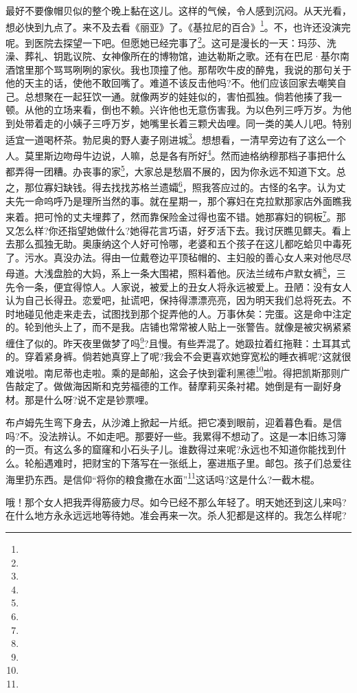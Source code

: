 \par 最好不要像帽贝似的整个晚上黏在这儿。这样的气候，令人感到沉闷。从天光看，想必快到九点了。来不及去看《丽亚》了。《基拉尼的百合》\footnote{}。不，也许还没演完呢。到医院去探望一下吧。但愿她已经完事了\footnote{}。这可是漫长的一天：玛莎、洗澡、葬礼、钥匙议院、女神像所在的博物馆，迪达勒斯之歌。还有在巴尼·基尔南酒馆里那个骂骂咧咧的家伙。我也顶撞了他。那帮吹牛皮的醉鬼，我说的那句关于他的天主的话，使他不敢回嘴了。难道不该反击他吗?不。他们应该回家去嘲笑自己。总想聚在一起狂饮一通。就像两岁的娃娃似的，害怕孤独。倘若他揍了我一顿。从他的立场来看，倒也不赖。兴许他也无意伤害我。为以色列三呼万岁。为他到处带着走的小姨子三呼万岁，她嘴里长着三颗犬齿哩。同一类的美人儿吧。特别适宜一道喝杯茶。勃尼奥的野人妻子刚进城\footnote{}。想想看，一清早旁边有了这么一个人。莫里斯边吻母牛边说，人嘛，总是各有所好\footnote{}。然而迪格纳穆那档子事把什么都弄得一团糟。办丧事的家\footnote{}，大家总是愁眉不展的，因为你永远不知道下文。总之，那位寡妇缺钱。得去找找苏格兰遗孀\footnote{}，照我答应过的。古怪的名字。认为丈夫先一命呜呼乃是理所当然的事。就在星期一，那个寡妇在克拉默那家店外面瞧我来着。把可怜的丈夫埋葬了，然而靠保险金过得也蛮不错。她那寡妇的铜板\footnote{}。那又怎么样?你还指望她做什么?她得花言巧语，好歹活下去。我讨厌瞧见鳏夫。看上去那么孤独无助。奥康纳这个人好可怜哪，老婆和五个孩子在这儿都吃蛤贝中毒死了。污水。真没办法。得由一位戴卷边平顶毡帽的、主妇般的善心女人来对他尽尽母道。大浅盘脸的大妈，系上一条大围裙，照料着他。灰法兰绒布卢默女裤\footnote{}，三先令一条，便宜得惊人。人家说，被爱上的丑女人将永远被爱上。丑陋：没有女人认为自己长得丑。恋爱吧，扯谎吧，保持得漂漂亮亮，因为明天我们总将死去。不时地碰见他走来走去，试图找到那个捉弄他的人。万事休矣：完蛋。这是命中注定的。轮到他头上了，而不是我。店铺也常常被人贴上一张警告。就像是被灾祸紧紧缠住了似的。昨天夜里做梦了吗\footnote{}?且慢。有些弄混了。她趿拉着红拖鞋：土耳其式的。穿着紧身裤。倘若她真穿上了呢?我会不会更喜欢她穿宽松的睡衣裤呢?这就很难说啦。南尼蒂也走啦。乘的是邮船，这会子快到霍利黑德\footnote{}啦。得把凯斯那则广告敲定了。做做海因斯和克劳福德的工作。替摩莉买条衬裙。她倒是有一副好身材。那是什么呀?说不定是钞票哩。
\par 布卢姆先生弯下身去，从沙滩上掀起一片纸。把它凑到眼前，迎着暮色看。是信吗?不。没法辨认。不如走吧。那要好一些。我累得不想动了。这是一本旧练习簿的一页。有这么多的窟窿和小石头子儿。谁数得过来呢?永远也不知道你能找到什么。轮船遇难时，把财宝的下落写在一张纸上，塞进瓶子里。邮包。孩子们总爱往海里扔东西。是信仰“将你的粮食撒在水面”\footnote{}这话吗?这是什么?一截木棍。
\par 哦！那个女人把我弄得筋疲力尽。如今已经不那么年轻了。明天她还到这儿来吗?在什么地方永永远远地等待她。准会再来一次。杀人犯都是这样的。我怎么样呢?
